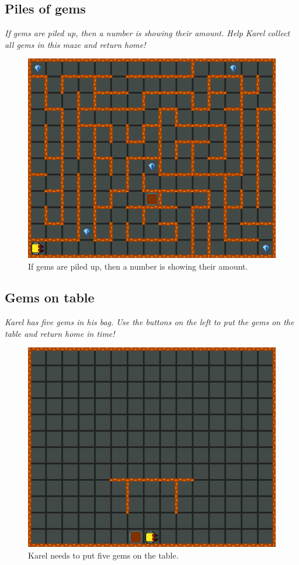 \subsection{Piles of gems}

{\em If gems are piled up, then a number is showing their amount. 
Help Karel collect all gems in this maze and return home!}

\begin{figure}[!ht]
\begin{center}
\includegraphics[height=0.4\textwidth]{img/a12.png}
\end{center}
\vspace{-4mm}
\caption{If gems are piled up, then a number is showing their amount.}
\label{fig:a12}
\vspace{-10mm}
\end{figure}
\noindent

\subsection{Gems on table}

{\em Karel has five gems in his bag. Use the buttons on the left to put the gems on the table and 
return home in time!}

\begin{figure}[!ht]
\begin{center}
\includegraphics[height=0.4\textwidth]{img/a13.png}
\end{center}
\vspace{-4mm}
\caption{Karel needs to put five gems on the table.}
\label{fig:a13}
\vspace{-4mm}
\end{figure}
\noindent

